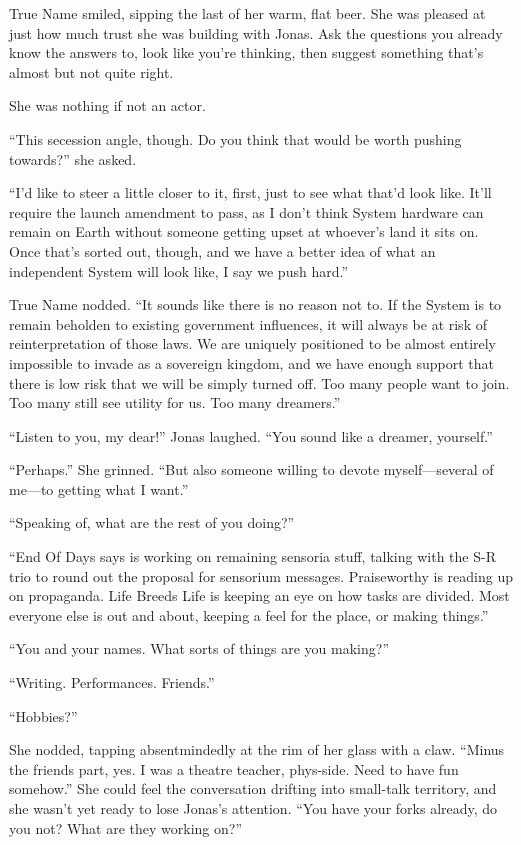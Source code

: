 True Name smiled, sipping the last of her warm, flat beer. She was pleased at just how much trust she was building with Jonas. Ask the questions you already know the answers to, look like you're thinking, then suggest something that's almost but not quite right.

She was nothing if not an actor.

``This secession angle, though. Do you think that would be worth pushing towards?'' she asked.

``I'd like to steer a little closer to it, first, just to see what that'd look like. It'll require the launch amendment to pass, as I don't think System hardware can remain on Earth without someone getting upset at whoever's land it sits on. Once that's sorted out, though, and we have a better idea of what an independent System will look like, I say we push hard.''

True Name nodded. ``It sounds like there is no reason not to. If the System is to remain beholden to existing government influences, it will always be at risk of reinterpretation of those laws. We are uniquely positioned to be almost entirely impossible to invade as a sovereign kingdom, and we have enough support that there is low risk that we will be simply turned off. Too many people want to join. Too many still see utility for us. Too many dreamers.''

``Listen to you, my dear!'' Jonas laughed. ``You sound like a dreamer, yourself.''

``Perhaps.'' She grinned. ``But also someone willing to devote myself---several of me---to getting what I want.''

``Speaking of, what are the rest of you doing?''

``End Of Days says is working on remaining sensoria stuff, talking with the S-R trio to round out the proposal for sensorium messages. Praiseworthy is reading up on propaganda. Life Breeds Life is keeping an eye on how tasks are divided. Most everyone else is out and about, keeping a feel for the place, or making things.''

``You and your names. What sorts of things are you making?''

``Writing. Performances. Friends.''

``Hobbies?''

She nodded, tapping absentmindedly at the rim of her glass with a claw. ``Minus the friends part, yes. I was a theatre teacher, phys-side. Need to have fun somehow.'' She could feel the conversation drifting into small-talk territory, and she wasn't yet ready to lose Jonas's attention. ``You have your forks already, do you not? What are they working on?''

